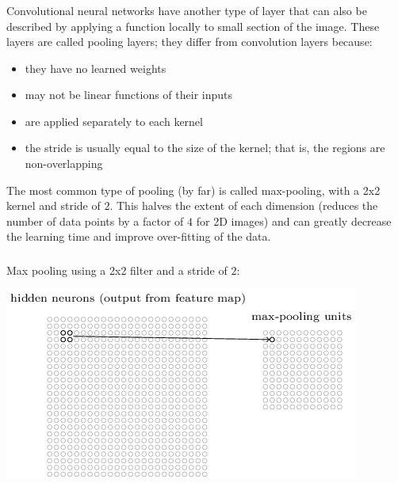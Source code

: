 \documentclass[xetex,mathserif,serif,aspectratio=169]{beamer}
\begin{document}
\begin{frame}[fragile] \frametitle{} \oldB \small

\textbf{}

Convolutional neural networks have another type of layer that can
also be described by applying a function locally to small section
of the image. These layers are called pooling layers; they differ
from convolution layers because:
\begin{itemize}
\item they have no learned weights
\item may not be linear functions of their inputs
\item are applied separately to each kernel
\item the stride is usually equal to the size of the kernel; that is,
the regions are non-overlapping
\end{itemize}
The most common type of pooling (by far) is called max-pooling, with
a 2x2 kernel and stride of $2$.
This halves the extent of each dimension (reduces the
number of data points by a factor of $4$ for 2D images) and can greatly
decrease the learning time and improve over-fitting of the data.

\end{frame}

\begin{frame}[fragile] \frametitle{} \oldB \small

Max pooling using a 2x2 filter and a stride of $2$:

\begin{center}
\includegraphics[height=0.7\textheight]{img/tikz47.png}
\end{center}

\end{frame}
\end{document}
